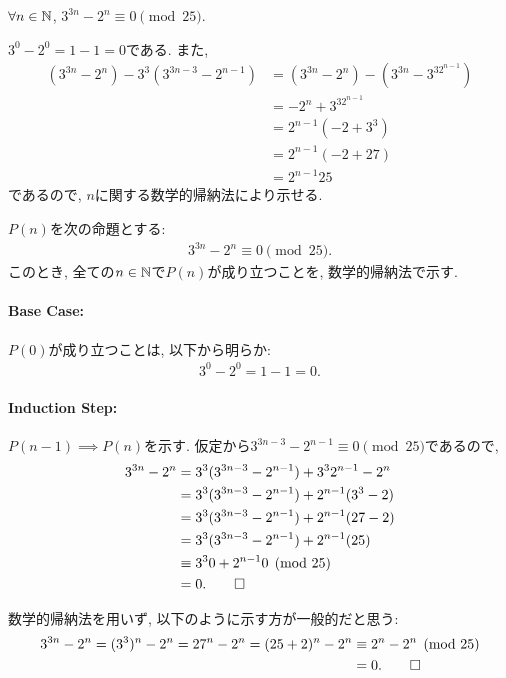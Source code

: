 \begin{prop}
  \label{p:20230803}
  $\forall n\in \mathbb{N}$,
  $3^{3n}-2^n\equiv 0\pmod{25}$.
\end{prop}

\begin{proof**}
  $3^{0}-2^0=1-1=0$である.
  また,
  \begin{align*}
    (3^{3n}-2^n)-3^3(3^{3n-3}-2^{n-1})
    &=(3^{3n}-2^n)-(3^{3n}-3^32^{n-1})\\
    &=-2^n+3^32^{n-1}\\
    &=2^{n-1}(-2+3^3)\\
    &=2^{n-1}(-2+27)\\
    &=2^{n-1}25
  \end{align*}
  であるので,
  $n$に関する数学的帰納法により示せる.
\end{proof**}

\begin{proof*}
  $P(n)$を次の命題とする:
  \begin{align*}
    3^{3n}-2^n\equiv 0\pmod{25}
    .
  \end{align*}
  このとき,
  全ての$n\in\mathbb{N}$で$P(n)$が成り立つことを,
  数学的帰納法で示す.

  \paragraph{Base Case:}
  $P(0)$が成り立つことは, 以下から明らか:
  \begin{align*}
    3^{0}-2^0=1-1=0.
  \end{align*}

  \paragraph{Induction Step:}
  $P(n-1)\implies P(n)$を示す.
  仮定から$3^{3n-3}-2^{n-1}\equiv 0\pmod{25}$であるので,
  \begin{align*}
    3^{3n}-2^n
    &=3^3(3^{3n-3}-2^{n-1})+3^32^{n-1}-2^n\\
    &=3^3(3^{3n-3}-2^{n-1})+2^{n-1}(3^3-2)\\
    &=3^3(3^{3n-3}-2^{n-1})+2^{n-1}(27-2)\\
    &=3^3(3^{3n-3}-2^{n-1})+2^{n-1}(25)\\
    &\equiv 3^30+2^{n-1}0\pmod{25}\\
    &=0
    .\qedhere
  \end{align*}
\end{proof*}

\begin{rem}
  数学的帰納法を用いず, 以下のように示す方が一般的だと思う:
  \begin{align*}
    3^{3n}-2^n
    =(3^3)^n-2^n
    =27^n-2^n
    =(25+2)^n-2^n
    &\equiv 2^n-2^n \pmod{25}\\
    &=0
    .\qedhere
  \end{align*}
\end{rem}

